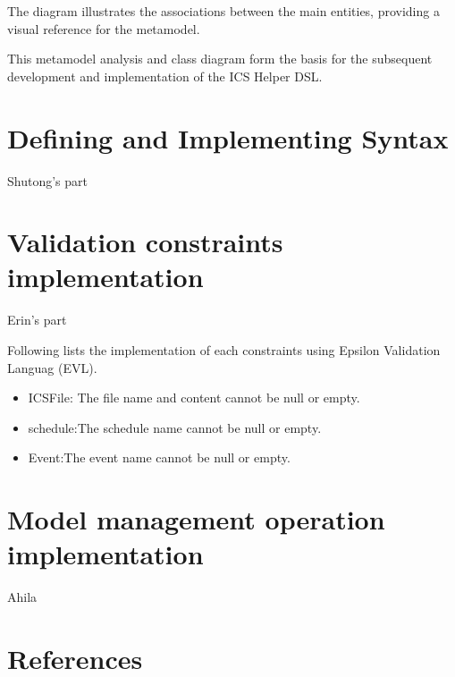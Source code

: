 \documentclass[12pt, letterpaper, twoside]{article}
\begin{document}
The diagram illustrates the associations between the main entities, providing a visual reference for the metamodel.

This metamodel analysis and class diagram form the basis for the subsequent development and implementation of the ICS Helper DSL.


\newpage
\section{Defining and Implementing Syntax}
Shutong's part

\newpage
\section{Validation constraints implementation}
Erin's part

Following lists the implementation of each constraints using Epsilon Validation Languag (EVL).
\begin{itemize}
    \item ICSFile: The file name and content cannot be null or empty.    
    \item schedule:The schedule name cannot be null or empty.
    \item Event:The event name cannot be null or empty. 
\end{itemize}

\newpage
\section{Model management operation implementation}
Ahila



% 
% 

\section{References}
\end{document}
